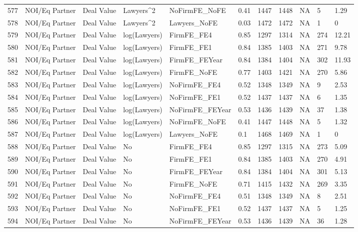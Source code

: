 \begin{table}[ht]
\begin{tabular}{rllllllllll}
  577 & NOI/Eq Partner & Deal Value & Lawyers^2 & NoFirmFE\_NoFE & 0.41 & 1447 & 1448 & NA & 5 & 1.29 \\ 
  578 & NOI/Eq Partner & Deal Value & Lawyers^2 & Lawyers\_NoFE & 0.03 & 1472 & 1472 & NA & 1 & 0 \\ 
  579 & NOI/Eq Partner & Deal Value & log(Lawyers) & FirmFE\_FE4 & 0.85 & 1297 & 1314 & NA & 274 & 12.21 \\ 
  580 & NOI/Eq Partner & Deal Value & log(Lawyers) & FirmFE\_FE1 & 0.84 & 1385 & 1403 & NA & 271 & 9.78 \\ 
  581 & NOI/Eq Partner & Deal Value & log(Lawyers) & FirmFE\_FEYear & 0.84 & 1384 & 1404 & NA & 302 & 11.93 \\ 
  582 & NOI/Eq Partner & Deal Value & log(Lawyers) & FirmFE\_NoFE & 0.77 & 1403 & 1421 & NA & 270 & 5.86 \\ 
  583 & NOI/Eq Partner & Deal Value & log(Lawyers) & NoFirmFE\_FE4 & 0.52 & 1348 & 1349 & NA & 9 & 2.53 \\ 
  584 & NOI/Eq Partner & Deal Value & log(Lawyers) & NoFirmFE\_FE1 & 0.52 & 1437 & 1437 & NA & 6 & 1.35 \\ 
  585 & NOI/Eq Partner & Deal Value & log(Lawyers) & NoFirmFE\_FEYear & 0.53 & 1436 & 1439 & NA & 37 & 1.38 \\ 
  586 & NOI/Eq Partner & Deal Value & log(Lawyers) & NoFirmFE\_NoFE & 0.41 & 1447 & 1448 & NA & 5 & 1.32 \\ 
  587 & NOI/Eq Partner & Deal Value & log(Lawyers) & Lawyers\_NoFE & 0.1 & 1468 & 1469 & NA & 1 & 0 \\ 
  588 & NOI/Eq Partner & Deal Value & No & FirmFE\_FE4 & 0.85 & 1297 & 1315 & NA & 273 & 5.09 \\ 
  589 & NOI/Eq Partner & Deal Value & No & FirmFE\_FE1 & 0.84 & 1385 & 1403 & NA & 270 & 4.91 \\ 
  590 & NOI/Eq Partner & Deal Value & No & FirmFE\_FEYear & 0.84 & 1384 & 1404 & NA & 301 & 5.13 \\ 
  591 & NOI/Eq Partner & Deal Value & No & FirmFE\_NoFE & 0.71 & 1415 & 1432 & NA & 269 & 3.35 \\ 
  592 & NOI/Eq Partner & Deal Value & No & NoFirmFE\_FE4 & 0.51 & 1348 & 1349 & NA & 8 & 2.51 \\ 
  593 & NOI/Eq Partner & Deal Value & No & NoFirmFE\_FE1 & 0.52 & 1437 & 1437 & NA & 5 & 1.25 \\ 
  594 & NOI/Eq Partner & Deal Value & No & NoFirmFE\_FEYear & 0.53 & 1436 & 1439 & NA & 36 & 1.28 \\ 

\end{tabular}
\end{table}
